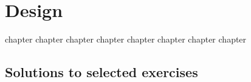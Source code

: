 

\part{Design}
\label{part:co-design}


{chapter}
{chapter}
{chapter}
{chapter}
{chapter}
{chapter}
{chapter}
{chapter}

\chapter{Solutions to selected exercises}
\printsolutions

